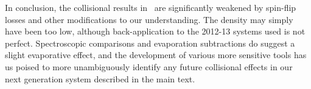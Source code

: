 \documentclass[%
 reprint,
 amsmath,amssymb,
 aps,
prl,
]{revtex4-1}
\begin{document}

In conclusion, the collisional results in~\cite{Stuhl2012evap,Stuhl2013} are significantly weakened by spin-flip losses and other modifications to our understanding. The density may simply have been too low, although back-application to the 2012-13 systems used is not perfect. Spectroscopic comparisons and evaporation subtractions do suggest a slight evaporative effect, and the development of various more sensitive tools has us poised to more unambiguously identify any future collisional effects in our next generation system described in the main text.



\end{document}
